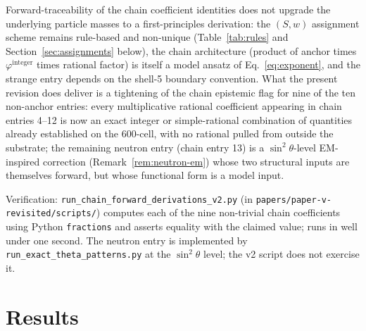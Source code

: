 \documentclass[12pt]{article}
\newcommand{\phig}{\varphi}
\begin{document}
Forward-traceability of the chain coefficient identities does not upgrade the underlying particle masses to a first-principles derivation: the $(S, w)$ assignment scheme remains rule-based and non-unique (Table~\ref{tab:rules} and Section~\ref{sec:assignments} below), the chain architecture (product of anchor times $\phig^{\text{integer}}$ times rational factor) is itself a model ansatz of Eq.~\eqref{eq:exponent}, and the strange entry depends on the shell-5 boundary convention. What the present revision does deliver is a tightening of the chain epistemic flag for nine of the ten non-anchor entries: every multiplicative rational coefficient appearing in chain entries 4--12 is now an exact integer or simple-rational combination of quantities already established on the 600-cell, with no rational pulled from outside the substrate; the remaining neutron entry (chain entry 13) is a $\sin^2\theta$-level EM-inspired correction (Remark~\ref{rem:neutron-em}) whose two structural inputs are themselves forward, but whose functional form is a model input.

Verification: \texttt{run\_chain\_forward\_derivations\_v2.py} (in \texttt{papers/paper-v-revisited/scripts/}) computes each of the nine non-trivial chain coefficients using Python \texttt{fractions} and asserts equality with the claimed value; runs in well under one second. The neutron entry is implemented by \texttt{run\_exact\_theta\_patterns.py} at the $\sin^2\theta$ level; the v2 script does not exercise it.

\section{Results}\label{sec:results}
\end{document}
